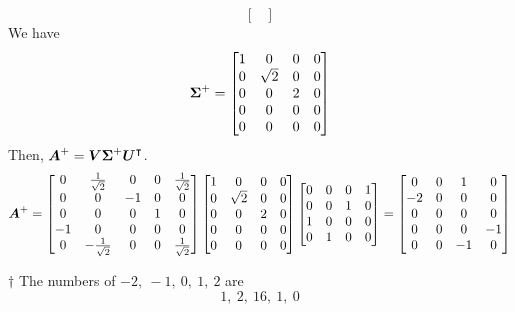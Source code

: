 \documentclass[a4paper,12pt]{article}
\begin{document}
\begin{enumerate}
\begin{equation}
\begin{bmatrix}
		\end{bmatrix} 
	\end{equation} We have \begin{equation}
		\boldsymbol{\Sigma}^{+} = \begin{bmatrix}
			1 & 0 & 0 & 0 \\
			0 & \sqrt{2} & 0 & 0 \\
			0 & 0 & 2 & 0 \\
			0 & 0 & 0 & 0 \\
			0 & 0 & 0 & 0
		\end{bmatrix}
	\end{equation} Then, $\boldsymbol{A}^{+} = \boldsymbol{V}\boldsymbol{\Sigma}^{+}\boldsymbol{U}^\intercal$. \begin{equation}
		\boldsymbol{A}^{+} = \begin{bmatrix}
			0 & \frac{1}{\sqrt{2}} & 0 & 0 & \frac{1}{\sqrt{2}} \\
			0 & 0 & -1 & 0 & 0 \\
			0 & 0 & 0 & 1 & 0 \\
			-1 & 0 & 0 & 0 & 0 \\
			0 & -\frac{1}{\sqrt{2}} & 0 & 0 & \frac{1}{\sqrt{2}}
		\end{bmatrix} \begin{bmatrix}
			1 & 0 & 0 & 0 \\
			0 & \sqrt{2} & 0 & 0 \\
			0 & 0 & 2 & 0 \\
			0 & 0 & 0 & 0 \\
			0 & 0 & 0 & 0
		\end{bmatrix} \begin{bmatrix}
			0 & 0 & 0 & 1 \\
			0 & 0 & 1 & 0 \\
			1 & 0 & 0 & 0 \\
			0 & 1 & 0 & 0
		\end{bmatrix} = \begin{bmatrix}
			0 & 0 & 1 & 0 \\
			-2 & 0 & 0 & 0 \\
			0 & 0 & 0 & 0 \\
			0 & 0 & 0 & -1 \\
			0 & 0 & -1 & 0
		\end{bmatrix}
	\end{equation}
	\begin{answer}{$\dag$} The numbers of $-2, \ -1, \ 0, \ 1, \ 2$ are \begin{equation}
			1, \ 2, \ 16, \ 1, \ 0
		\end{equation}
	\end{answer}

\end{enumerate}
\end{document}
